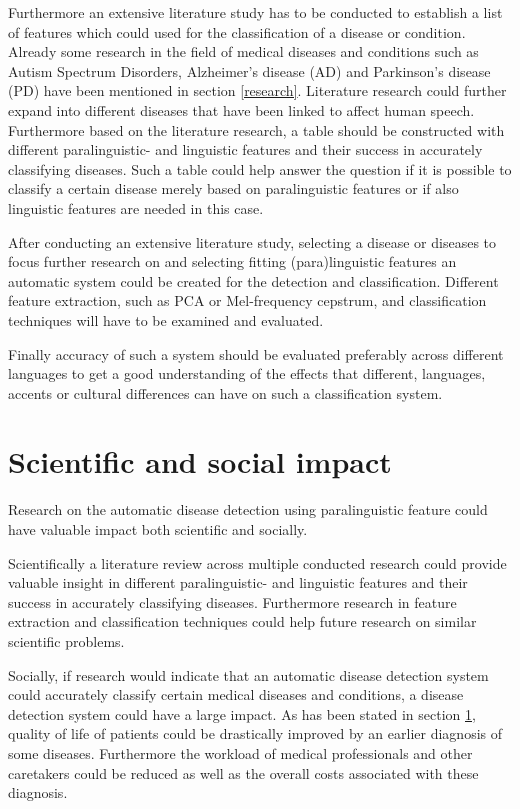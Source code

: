 \documentclass[conference]{IEEEtran}
\begin{document}
Furthermore an extensive literature study has to be conducted to establish a list of features which could used for the classification of a disease or condition. Already some research in the field of medical diseases and conditions such as Autism Spectrum Disorders, Alzheimer’s disease (AD) and Parkinson’s disease (PD) have been mentioned in section \ref{research}. Literature research could further expand into different diseases that have been linked to affect human speech. Furthermore based on the literature research, a table should be constructed with different paralinguistic- and linguistic features and their success in accurately classifying diseases. Such a table could help answer the question if it is possible to classify a certain disease merely based on paralinguistic features or if also linguistic features are needed in this case. 

After conducting an extensive literature study, selecting a disease or diseases to focus further research on and selecting fitting (para)linguistic features an automatic system could be created for the detection and classification. Different feature extraction, such as PCA or Mel-frequency cepstrum, and classification techniques will have to be examined and evaluated. 

Finally accuracy of such a system should be evaluated preferably across different languages to get a good understanding of the effects that different, languages, accents or cultural differences can have on such a classification system.



\section{Scientific and social impact} \label{impact}
Research on the automatic disease detection using paralinguistic feature could have valuable impact both scientific and socially.

Scientifically a literature review across multiple conducted research could provide valuable insight in different paralinguistic- and linguistic features and their success in accurately classifying diseases. Furthermore research in feature extraction and classification techniques could help future research on similar scientific problems.

Socially, if research would indicate that an automatic disease detection system could accurately classify certain medical diseases and conditions, a disease detection system could have a large impact. As has been stated in section \ref{impact}, quality of life of patients could be drastically improved by an earlier diagnosis of some diseases. Furthermore the workload of medical professionals and other caretakers could be reduced as well as the overall costs associated with these diagnosis.
\end{document}
